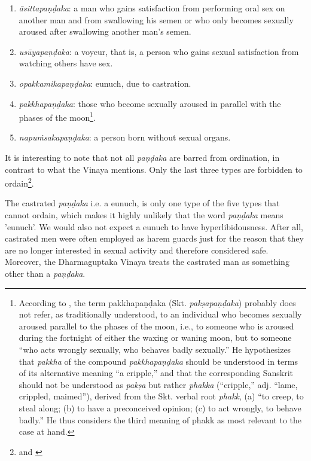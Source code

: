 \begin{enumerate}
\item {\em āsittapaṇḍaka}: a man who gains satisfaction from performing oral sex on another man and from swallowing his semen or who only becomes sexually aroused after swallowing another man’s semen. 
\item {\em usūyapaṇḍaka}: a voyeur, that is, a person who gains sexual satisfaction from watching others have sex. 
\item {\em opakkamikapaṇḍaka}: eunuch, due to castration.
\item {\em pakkhapaṇḍaka}: those who become sexually aroused in parallel with the phases of the moon\footnote{According to \cite{bomhard}, the term pakkhapaṇḍaka (Skt. {\em pakṣapaṇḍaka}) probably does not refer, as traditionally understood, to an individual who becomes sexually aroused parallel to the phases of the moon, i.e., to someone who is aroused during the fortnight of either the waxing or waning moon, but to someone “who acts wrongly sexually, who behaves badly sexually.” He hypothesizes that {\em pakkha} of the compound {\em pakkhapaṇḍaka} should be understood in terms of its alternative meaning “a cripple,” and that the corresponding Sanskrit should not be understood as {\em pakṣa} but rather {\em phakka} (“cripple,” adj. “lame, crippled, maimed”), derived from the Skt. verbal root {\em phakk}, (a) “to creep, to steal along; (b) to have a preconceived opinion; (c) to act wrongly, to behave badly.” He thus considers the third meaning of phakk as most relevant to the case at hand.}.
\item {\em napuṁsakapaṇḍaka}: a person born without sexual organs. 
\end{enumerate}

It is interesting to note that not all {\em paṇḍaka} are barred from ordination, in contrast to what the Vinaya mentions. Only the last three types are forbidden to ordain\footnote{\cite{wong} and \cite{thanissaro}}.

The castrated {\em paṇḍaka} i.e. a eunuch, is only one type of the five types that cannot ordain, which makes it highly unlikely that the word {\em paṇḍaka} means 'eunuch'. We would also not expect a eunuch to have hyperlibidousness. After all, castrated men were often employed as harem guards just for the reason that they are no longer interested in sexual activity and therefore considered safe. Moreover, the Dharmaguptaka Vinaya treats the castrated man as something other than a {\em paṇḍaka}.

